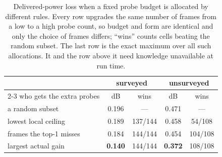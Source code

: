 \begin{table}[t]
\centering
\setlength{\tabcolsep}{3pt}
\renewcommand{\arraystretch}{1.05}
\small
\begin{tabular}{lcccc}
\hline
& \multicolumn{2}{c}{surveyed} & \multicolumn{2}{c}{unsurveyed}\\
\cline{2-3}\cline{4-5}
who gets the extra probes & dB & wins & dB & wins\\
\hline
a random subset & 0.196 & --- & 0.471 & ---\\
lowest local ceiling & 0.189 & 137/144 & 0.458 & 54/108\\
frames the top-1 misses & 0.184 & 144/144 & 0.454 & 104/108\\
largest actual gain & \textbf{0.140} & 144/144 & \textbf{0.372} & 108/108\\
\hline
\end{tabular}
\caption{Delivered-power loss when a fixed probe budget is allocated by different rules. Every
row upgrades the same number of frames from a low to a high probe count, so budget and form are
identical and only the choice of frames differs; ``wins'' counts cells beating the random
subset. The last row is the exact maximum over all such allocations. It and the row above it
need knowledge unavailable at run time.}
\label{tab:alloc}
\end{table}
